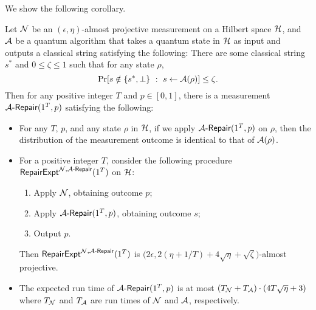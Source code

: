 We show the following corollary.
\begin{corollary}\label{cor:repair}
Let $\mathcal{N}$ be an $(\epsilon,\eta)$-almost projective measurement on a Hilbert space $\mathcal{H}$, and $\mathcal{A}$ be a quantum algorithm that takes a quantum state in $\mathcal{H}$ as input and outputs a classical string satisfying the following:
There are some classical string $s^*$ and $0\le \zeta \le 1$ such that for any state $\rho$, 
$$\Pr[s \notin \{s^*, \bot\}~:~s \leftarrow \mathcal{A}(\rho)]\le \zeta.$$
Then for any positive integer $T$ and $p\in[0,1]$, there is a measurement $\mathcal{A}\text{-}\mathsf{Repair}(1^T,p)$ 
satisfying the following: 
\begin{itemize}
\item For any $T$, $p$, and any state $\rho$ in $\mathcal{H}$, if we apply $\mathcal{A}\text{-}\mathsf{Repair}(1^T,p)$ on $\rho$, then the distribution of the measurement outcome is identical to that of $\mathcal{A}(\rho)$. 
\item For a positive integer $T$, consider the following procedure $\mathsf{RepairExpt}^{\mathcal{N},\mathcal{A}\text{-}\mathsf{Repair}}(1^T)$ on $\mathcal{H}$: 
\begin{enumerate}
\item Apply $\mathcal{N}$, obtaining outcome $p$; 
\item Apply $\mathcal{A}\text{-}\mathsf{Repair}(1^T,p)$, obtaining outcome $s$; 
\item Output $p$.
\end{enumerate}
Then $\mathsf{RepairExpt}^{\mathcal{N},\mathcal{A}\text{-}\mathsf{Repair}}(1^T)$ is $\big(2\epsilon,2(\eta+1/T)+4\sqrt{\eta}+\sqrt{\zeta}\big)$-almost projective. 
\item The expected run time of  %
$\mathcal{A}\text{-}\mathsf{Repair}(1^T,p)$
is at most $(T_{\mathcal{N}}+T_{\mathcal{A}})\cdot (4T\sqrt{\eta}+3)$ where  $T_{\mathcal{N}}$ and $T_{\mathcal{A}}$ are run times of $\mathcal{
N}$ and $\mathcal{A}$, respectively. 
\end{itemize}
\end{corollary}
